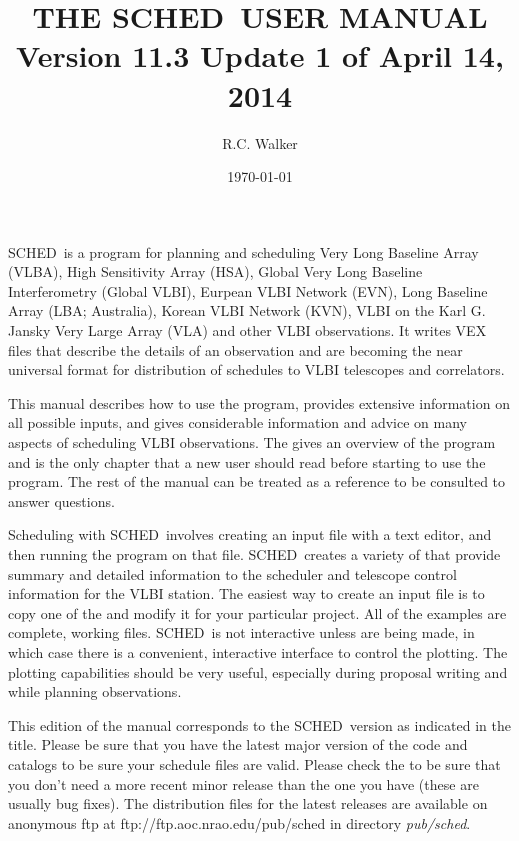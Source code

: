 \documentclass{report}
\newcommand{\schedb}{{\sc SCHED~}}
\begin{document}
\title{THE \schedb USER MANUAL \\  Version 11.3 Update 1 of April 14, 2014}
\author{R.C. Walker}
\date{\today}
\maketitle




\schedb is a program for planning and scheduling Very Long Baseline
Array (VLBA), High Sensitivity Array (HSA), Global Very Long Baseline
Interferometry (Global VLBI), Eurpean VLBI Network (EVN), Long
Baseline Array (LBA; Australia), Korean VLBI Network (KVN), VLBI on
the Karl G. Jansky Very Large Array (VLA) and other VLBI observations.
It writes VEX files that describe the details of an observation and
are becoming the near universal format for distribution of schedules
to VLBI telescopes and correlators.

This manual describes how to use the program, provides extensive
information on all possible inputs, and gives considerable information
and advice on many aspects of scheduling VLBI observations.  The
 gives an overview of the program and
is the only chapter that a new user should read before starting to use
the program.  The rest of the manual can be treated as a reference to
be consulted to answer questions.

Scheduling with \schedb involves creating an input file with a text
editor, and then running the program on that file.  \schedb creates a
variety of  that provide summary and
detailed information to the scheduler and telescope control
information for the VLBI station.  The easiest way to create an input
file is to copy one of the  and
modify it for your particular project.  All of the examples are
complete, working files.  \schedb is not interactive unless
 are being made, in which case there is a
convenient, interactive interface to control the plotting.  The
plotting capabilities should be very useful, especially during
proposal writing and while planning observations.

This edition of the manual corresponds to the \schedb version as
indicated in the title.  Please be sure that you have the latest major
version of the code and catalogs to be sure your schedule files are
valid.  Please check the  to be sure that you don't need a more recent
minor release than the one you have (these are usually bug fixes).
The distribution files for the latest releases are available on
anonymous ftp at 
{ftp://ftp.aoc.nrao.edu/pub/sched} in directory {\sl pub/sched}.
\end{document}
